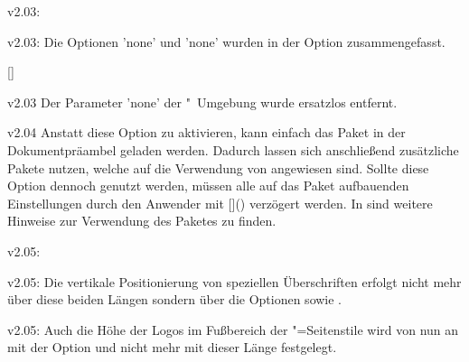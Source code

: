 \begin{Obsolete}{v2.03:}{}
\begin{Obsolete}{v2.03:}{}
\printobsoletelist%
%
Die Optionen 'none' und 'none' wurden in der 
Option  zusammengefasst.
\end{Obsolete}
\end{Obsolete}

\begin{Obsolete}{}{[]}
\begin{Obsolete}{v2.03}{}
\printobsoletelist%
%
Der Parameter 'none' der 
"~Umgebung wurde ersatzlos entfernt.
\end{Obsolete}
\end{Obsolete}


%
\begin{Obsolete}{v2.04}{}%
\printobsoletelist%
%
Anstatt diese Option zu aktivieren, kann einfach das Paket  
in der Dokumentpräambel geladen werden. Dadurch lassen sich anschließend 
zusätzliche Pakete nutzen, welche auf die Verwendung von  
angewiesen sind. Sollte diese Option dennoch genutzt werden, müssen alle auf 
das Paket  aufbauenden Einstellungen durch den Anwender mit 
[\MPValue{\dots}]() 
verzögert werden. In  sind weitere Hinweise zur Verwendung 
des Paketes  zu finden.
\end{Obsolete}


%
\begin{Obsolete}{v2.05:}{}
\begin{Obsolete}{v2.05:}{}
\printobsoletelist%
%
Die vertikale Positionierung von speziellen Überschriften erfolgt nicht mehr 
über diese beiden Längen sondern über die Optionen  
sowie .
\end{Obsolete}
\end{Obsolete}


\begin{Obsolete}{v2.05:}{}%
\printobsoletelist%
%
Auch die Höhe der Logos im Fußbereich der "=Seitenstile 
wird von nun an mit der Option  und nicht mehr mit 
dieser Länge festgelegt.
\end{Obsolete}


